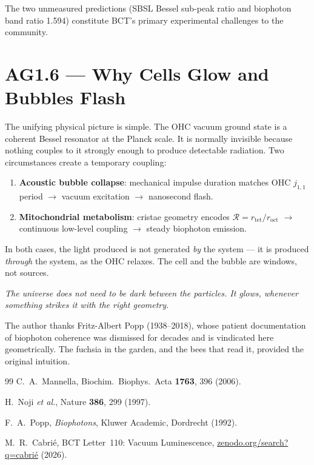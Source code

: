 \documentclass[aps,prl,twocolumn,showpacs,superscriptaddress]{revtex4-2}
\begin{document}
The two unmeasured predictions (SBSL Bessel sub-peak ratio and
biophoton band ratio 1.594) constitute BCT's primary experimental
challenges to the community.

\section{AG1.6 --- Why Cells Glow and Bubbles Flash}

The unifying physical picture is simple. The OHC vacuum ground state
is a coherent Bessel resonator at the Planck scale. It is normally
invisible because nothing couples to it strongly enough to produce
detectable radiation. Two circumstances create a temporary coupling:

\begin{enumerate}
\item \textbf{Acoustic bubble collapse}: mechanical impulse duration
matches OHC $j_{1,1}$ period $\to$ vacuum excitation $\to$
nanosecond flash.

\item \textbf{Mitochondrial metabolism}: cristae geometry encodes
$\mathcal{R} = r_\mathrm{tet}/r_\mathrm{oct}$ $\to$ continuous
low-level coupling $\to$ steady biophoton emission.
\end{enumerate}

In both cases, the light produced is not generated \textit{by} the
system --- it is produced \textit{through} the system, as the OHC
relaxes. The cell and the bubble are windows, not sources.

\textit{The universe does not need to be dark between the particles.
It glows, whenever something strikes it with the right geometry.}

\begin{acknowledgments}
The author thanks Fritz-Albert Popp (1938--2018), whose patient
documentation of biophoton coherence was dismissed for decades and
is vindicated here geometrically. The fuchsia in the garden, and the
bees that read it, provided the original intuition.
\end{acknowledgments}

\begin{thebibliography}{99}
 C.~A.~Mannella,
Biochim.~Biophys.~Acta \textbf{1763}, 396 (2006).

 H.~Noji \textit{et al.},
Nature \textbf{386}, 299 (1997).

 F.~A.~Popp, \textit{Biophotons},
Kluwer Academic, Dordrecht (1992).

 M.~R.~Cabri\'{e},
BCT Letter~110: Vacuum Luminescence,
\href{https://zenodo.org/search?q=cabri\'{e}}
{zenodo.org/search?q=cabri\'{e}} (2026).
\end{thebibliography}
\end{document}
